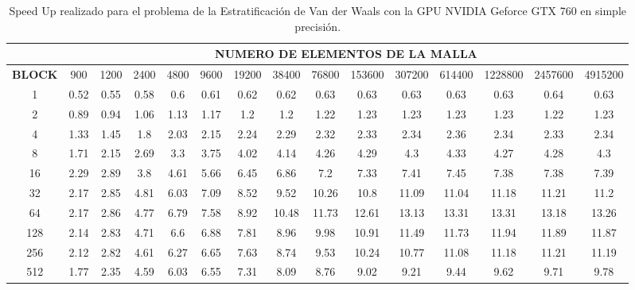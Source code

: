 \begin{table}[h!]
    \begin{tabular}{|c|c|c|c|c|c|c|c|c|c|c|c|c|c|c|}
    \hline
                   & \multicolumn{14}{c|}{\textbf{NUMERO DE ELEMENTOS DE LA MALLA}}                                                    \\ \hline
    \textbf{BLOCK} & 900  & 1200 & 2400 & 4800 & 9600 & 19200 & 38400 & 76800 & 153600 & 307200 & 614400 & 1228800 & 2457600 & 4915200 \\ \hline
    1              & 0.52 & 0.55 & 0.58 & 0.6  & 0.61 & 0.62  & 0.62  & 0.63  & 0.63   & 0.63   & 0.63   & 0.63    & 0.64    & 0.63    \\ \hline
    2              & 0.89 & 0.94 & 1.06 & 1.13 & 1.17 & 1.2   & 1.2   & 1.22  & 1.23   & 1.23   & 1.23   & 1.23    & 1.22    & 1.23    \\ \hline
    4              & 1.33 & 1.45 & 1.8  & 2.03 & 2.15 & 2.24  & 2.29  & 2.32  & 2.33   & 2.34   & 2.36   & 2.34    & 2.33    & 2.34    \\ \hline
    8              & 1.71 & 2.15 & 2.69 & 3.3  & 3.75 & 4.02  & 4.14  & 4.26  & 4.29   & 4.3    & 4.33   & 4.27    & 4.28    & 4.3     \\ \hline
    16             & 2.29 & 2.89 & 3.8  & 4.61 & 5.66 & 6.45  & 6.86  & 7.2   & 7.33   & 7.41   & 7.45   & 7.38    & 7.38    & 7.39    \\ \hline
    32             & 2.17 & 2.85 & 4.81 & 6.03 & 7.09 & 8.52  & 9.52  & 10.26 & 10.8   & 11.09  & 11.04  & 11.18   & 11.21   & 11.2    \\ \hline
    64             & 2.17 & 2.86 & 4.77 & 6.79 & 7.58 & 8.92  & 10.48 & 11.73 & 12.61  & 13.13  & 13.31  & 13.31   & 13.18   & 13.26   \\ \hline
    128            & 2.14 & 2.83 & 4.71 & 6.6  & 6.88 & 7.81  & 8.96  & 9.98  & 10.91  & 11.49  & 11.73  & 11.94   & 11.89   & 11.87   \\ \hline
    256            & 2.12 & 2.82 & 4.61 & 6.27 & 6.65 & 7.63  & 8.74  & 9.53  & 10.24  & 10.77  & 11.08  & 11.18   & 11.21   & 11.19   \\ \hline
    512            & 1.77 & 2.35 & 4.59 & 6.03 & 6.55 & 7.31  & 8.09  & 8.76  & 9.02   & 9.21   & 9.44   & 9.62    & 9.71    & 9.78    \\ \hline
    \end{tabular}
    \caption{Speed Up realizado para el problema de la Estratificación de Van der Waals con la GPU NVIDIA Geforce GTX 760 en simple precisión.}
    \label{tab:s_760_VdW_simple_10}
    \end{table}